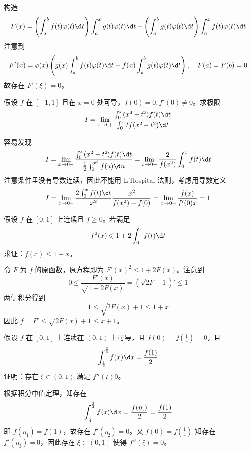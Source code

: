 \begin{solution}
	构造
	\[ F(x) = \left(\int_{a}^{b} f(t) \varphi(t) \d t\right) \int_{a}^{x} g(t) \varphi(t) \d t - \left(\int_{a}^{b} g(t)\varphi(t) \d t \right) \int_{a}^{x} f(t) \varphi(t) \d t \]
	注意到
	\[ F'(x) =  \varphi(x)\left(g(x)\int_{a}^{b} f(t) \varphi(t) \d t - f(x) \int_{a}^{b} g(t) \varphi(t) \d t \right), \quad F(a) = F(b) = 0 \]
	故存在 $F'(\xi) = 0$。
\end{solution}

\begin{problem}[000053]
假设 $f$ 在 $[-1, 1]$ 且在 $x=0$ 处可导，$f(0) = 0, f'(0) \neq 0$。求极限
\[ I = \lim_{x \to 0+} \frac{\int_{0}^{x}(x^2 - t^2) f(t) \d t}{\int_{0}^{x} t f(x^2 - t^2) \d t} \]
\end{problem}

\begin{solution}
	容易发现
	\[ I = \lim_{x \to 0+} \frac{\int_{0}^{x} (x^2 - t^2) f(t) \d t}{\frac{1}{2} \int_{0}^{x^2} f(u) \d u} = \lim_{x \to 0+} \frac{2}{f(x^2)}\int_{0}^{x}f(t) \d t \]
	注意条件里没有导数连续，因此不能用 L'Hospital 法则，考虑用导数定义
	\[ I = \lim_{x \to 0+} \frac{2 \int_{0}^{x}f(t) \d t}{x^2} \frac{x^2}{f(x^2) - f(0)} = \lim_{x \to 0+} \frac{f(x)}{f'(0) x} = 1 \]
\end{solution}

\begin{problem}[000054]
假设 $f$ 在 $[0, 1]$ 上连续且 $f \geqslant 0$。若满足
\[ f^2(x) \leqslant 1 + 2 \int_{0}^{x} f(t) \d t \]
求证：$f(x) \leqslant 1 + x$。
\end{problem}

\begin{solution}
	令 $F$ 为 $f$ 的原函数，原方程即为 $F'(x)^2 \leqslant 1 + 2F(x)$。注意到
	\[ 0 \leqslant \frac{F'(x)}{\sqrt{1 + 2 F(x)}} = \left(\sqrt{2F+1}\right)' \leqslant 1 \]
	两侧积分得到
	\[ 1 \leqslant \sqrt{2F(x) + 1}  \leqslant 1 + x \]
	因此 $f = F' \leqslant \sqrt{2F(x) + 1} \leqslant x + 1$。
\end{solution}

\begin{problem}[000055]
假设 $f$ 在 $[0, 1]$ 上连续在 $(0, 1)$ 上可导，且 $f(0) = f(\frac{1}{4}) = 0$，且
\[ \int_{\frac{1}{4}}^{\frac{3}{4}} f(x) \d x = \frac{f(1)}{2} \]
证明：存在 $\xi \in (0, 1)$ 满足 $f''(\xi)  0$。
\end{problem}

\begin{solution}
	根据积分中值定理，知存在
	\[ \int_{\frac{1}{4}}^{\frac{3}{4}} f(x) \d x = \frac{f(\eta_1)}{2} = \frac{f(1)}{2} \]
	即 $f(\eta_1) = f(1)$，故存在 $f'(\eta_2) = 0$。又 $f(0) = f(\frac{1}{4})$ 知存在 $f'(\eta_3) = 0$，因此存在 $\xi \in (0, 1)$ 使得 $f''(\xi) = 0$。
\end{solution}

